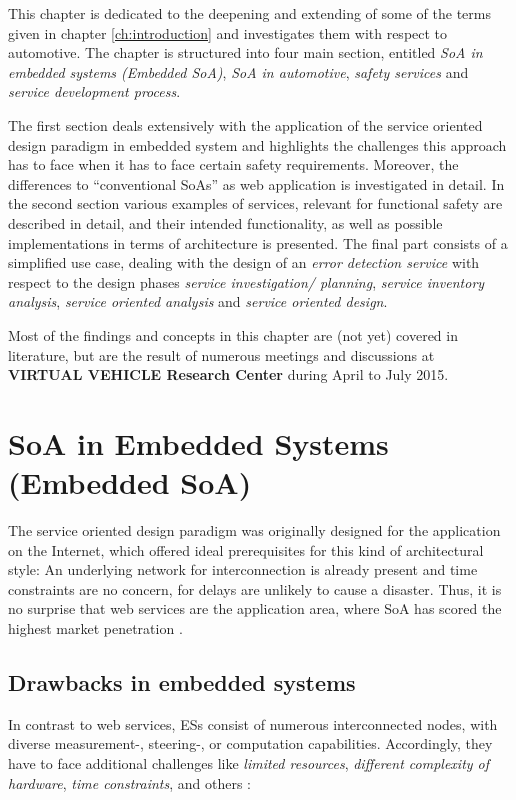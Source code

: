 \label{ch:results}
This chapter is dedicated to the deepening and extending of some of the terms given in chapter \ref{ch:introduction} and investigates them with respect to automotive. The chapter is structured into four main section, entitled \emph{SoA in embedded systems (Embedded SoA)}, \emph{SoA in automotive}, \emph{safety services} and \emph{service development process}. 

The first section deals extensively with the application of the service oriented design paradigm in embedded system and highlights the challenges this approach has to face when it has to face certain safety requirements. Moreover, the differences to ``conventional SoAs'' as web application is investigated in detail. In the second section various examples of services, relevant for functional safety are described in detail, and their intended functionality, as well as possible implementations in terms of architecture is presented. The final part consists of a simplified use case, dealing with the design of an \emph{error detection service} with respect to the design phases \emph{service investigation/ planning}, \emph{service inventory analysis}, \emph{service oriented analysis} and \emph{service oriented design}.

Most of the findings and concepts in this chapter are (not yet) covered in literature, but are the result of numerous meetings and discussions at \textbf{VIRTUAL VEHICLE Research Center} during April to July 2015.







\section{SoA in Embedded Systems (Embedded SoA)}
\label{sec:soa-in-embedded-systems}

The service oriented design paradigm was originally designed for the application on the Internet, which offered ideal prerequisites for this kind of architectural style: An underlying network for interconnection is already present and time constraints are no concern, for delays are unlikely to cause a disaster. Thus, it is no surprise that web services are the application area, where SoA has scored the highest market penetration \cite{rodrigues2011} \cite{buckl}.


\subsection{Drawbacks in embedded systems}
In contrast to web services, ESs consist of numerous interconnected nodes, with diverse measurement-, steering-, or computation capabilities. Accordingly, they have to face additional challenges like \emph{limited resources}, \emph{different complexity of hardware}, \emph{time constraints}, and others \cite{scholz} \cite{sommer}: 

